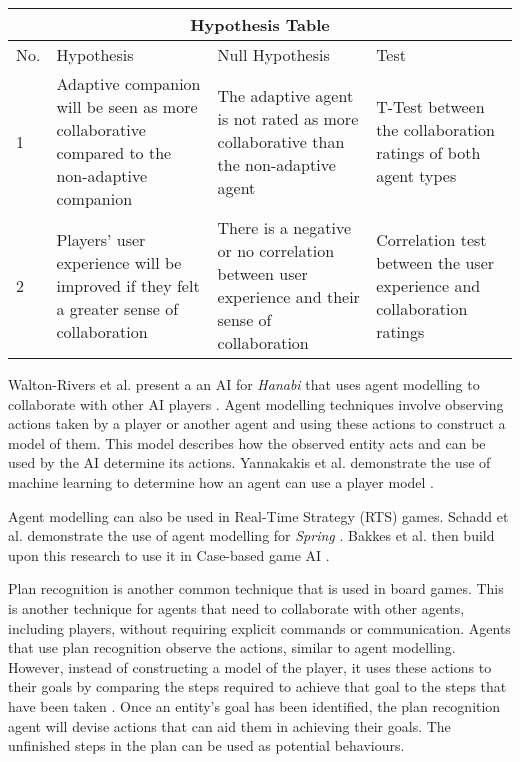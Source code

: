 \documentclass{IEEEtran}
\begin{document}
\begin{table*}[t]
\centering
\begin{tabular}{ |p{0.3cm}|p{6cm}|p{6cm}|p{5cm}|  }
 \hline
 \multicolumn{4}{|c|}{Hypothesis Table} \\
 \hline
 No. & Hypothesis & Null Hypothesis & Test\\
 \hline
    1 & Adaptive companion will be seen as more collaborative compared to the non-adaptive companion & 
    The adaptive agent is not rated as more collaborative than the non-adaptive agent &
    T-Test between the collaboration ratings of both agent types \\
 \hline
    2 & Players' user experience will be improved if they felt a greater sense of collaboration & 
    There is a negative or no correlation between user experience and their sense of collaboration &
    Correlation test between the user experience and collaboration ratings\\
 \hline
\end{tabular}

\end{table*}

Walton-Rivers et al. present a an AI for \textit{Hanabi} that uses agent modelling to collaborate with other AI players \cite{EvaluatingHanabiAgents}. Agent modelling techniques involve observing actions taken by a player or another agent and using these actions to construct a model of them. This model describes how the observed entity acts and can be used by the AI determine its actions. Yannakakis et al. demonstrate the use of machine learning to determine how an agent can use a player model \cite{yannakakis2013playermodelling}.

Agent modelling can also be used in Real-Time Strategy (RTS) games. Schadd et al. demonstrate the use of agent modelling for \textit{Spring} \cite{OpponentModellingRTS2007}. Bakkes et al. then build upon this research to use it in Case-based game AI \cite{bakkes2009opponentmodelling}.


Plan recognition is another common technique that is used in board games. This is another technique for agents that need to collaborate with other agents, including players, without requiring explicit commands or communication. Agents that use plan recognition observe the actions, similar to agent modelling. However, instead of constructing a model of the player, it uses these actions to their goals by comparing the steps required to achieve that goal to the steps that have been taken \cite{GeneratingCollabBehaviourPlanRecognition2016}. Once an entity’s goal has been identified, the plan recognition agent will devise actions that can aid them in achieving their goals. The unfinished steps in the plan can be used as potential behaviours.
\end{document}
